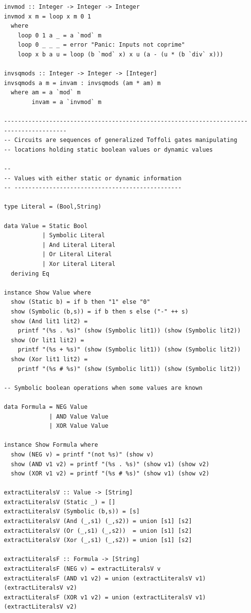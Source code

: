 \documentclass{article}
\begin{document}
\begin{verbatim}
invmod :: Integer -> Integer -> Integer
invmod x m = loop x m 0 1
  where
    loop 0 1 a _ = a `mod` m
    loop 0 _ _ _ = error "Panic: Inputs not coprime"
    loop x b a u = loop (b `mod` x) x u (a - (u * (b `div` x)))

invsqmods :: Integer -> Integer -> [Integer]
invsqmods a m = invam : invsqmods (am * am) m
  where am = a `mod` m
        invam = a `invmod` m 

----------------------------------------------------------------------------------------
-- Circuits are sequences of generalized Toffoli gates manipulating
-- locations holding static boolean values or dynamic values

--
-- Values with either static or dynamic information
-- ------------------------------------------------

type Literal = (Bool,String)

data Value = Static Bool
           | Symbolic Literal
           | And Literal Literal
           | Or Literal Literal
           | Xor Literal Literal
  deriving Eq

instance Show Value where
  show (Static b) = if b then "1" else "0"
  show (Symbolic (b,s)) = if b then s else ("-" ++ s)
  show (And lit1 lit2) = 
    printf "(%s . %s)" (show (Symbolic lit1)) (show (Symbolic lit2))
  show (Or lit1 lit2) = 
    printf "(%s + %s)" (show (Symbolic lit1)) (show (Symbolic lit2))
  show (Xor lit1 lit2) = 
    printf "(%s # %s)" (show (Symbolic lit1)) (show (Symbolic lit2))

-- Symbolic boolean operations when some values are known

data Formula = NEG Value
             | AND Value Value
             | XOR Value Value

instance Show Formula where
  show (NEG v) = printf "(not %s)" (show v)
  show (AND v1 v2) = printf "(%s . %s)" (show v1) (show v2)
  show (XOR v1 v2) = printf "(%s # %s)" (show v1) (show v2)

extractLiteralsV :: Value -> [String]
extractLiteralsV (Static _) = []
extractLiteralsV (Symbolic (b,s)) = [s]
extractLiteralsV (And (_,s1) (_,s2)) = union [s1] [s2]
extractLiteralsV (Or (_,s1) (_,s2))  = union [s1] [s2]
extractLiteralsV (Xor (_,s1) (_,s2)) = union [s1] [s2] 

extractLiteralsF :: Formula -> [String]
extractLiteralsF (NEG v) = extractLiteralsV v
extractLiteralsF (AND v1 v2) = union (extractLiteralsV v1) (extractLiteralsV v2)
extractLiteralsF (XOR v1 v2) = union (extractLiteralsV v1) (extractLiteralsV v2)


\end{verbatim}
\end{document}
